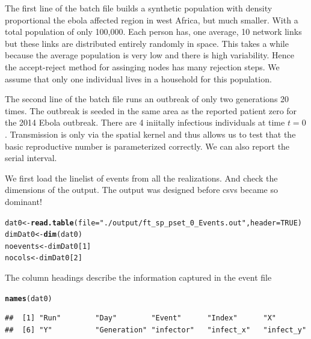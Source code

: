 \documentclass{article}\usepackage{graphicx, color}
\makeatletter
\newcommand{\hlfunctioncall}[1]{\textcolor[rgb]{0.501960784313725,0,0.329411764705882}{\textbf{#1}}}%
\newcommand{\hlstring}[1]{\textcolor[rgb]{0.6,0.6,1}{#1}}%
\newenvironment{kframe}{%
 \def\at@end@of@kframe{}%
 \ifinner\ifhmode%
  \def\at@end@of@kframe{\end{minipage}}%
  \begin{minipage}{\columnwidth}%
 \fi\fi%
 \def\FrameCommand##1{\hskip\@totalleftmargin \hskip-\fboxsep
 \colorbox{shadecolor}{##1}\hskip-\fboxsep
     \hskip-\linewidth \hskip-\@totalleftmargin \hskip\columnwidth}%
 \MakeFramed {\advance\hsize-\width
   \@totalleftmargin\z@ \linewidth\hsize
   \@setminipage}}%
 {\par\unskip\endMakeFramed%
 \at@end@of@kframe}
\newenvironment{knitrout}{}{} %
\makeatother
\begin{document}
The first line of the batch file builds a synthetic population with density
proportional the ebola affected region in west Africa, but much smaller. With a total population of only
100,000. Each person has, one average, 10 network links but these links are
distributed entirely randomly in space. This takes a while because the
average population is very low and there is high variability. Hence the
accept-reject method for assinging nodes has many rejection steps. We assume
that only one individual lives in a household for this population. 


The second line of the batch file runs an outbreak of only two generations 20
times. The outbreak is seeded in the same area as the reported patient zero for
the 2014 Ebola outbreak. There are 4 iniitally infectious individuals at time
$t=0$. Transmission is only via the spatial kernel and thus allows us to test
that the basic reproductive number is parameterized correctly. We can also
report the serial interval.

We first load the linelist of events from all the realizations. And check the
dimensions of the output. The output was designed before csvs became so
dominant!

\begin{knitrout}
\color{fgcolor}\begin{kframe}
\begin{alltt}
dat0 <- \hlfunctioncall{read.table}(file=\hlstring{"./output/ft_sp_pset_0_Events.out"},header=TRUE)
dimDat0 <- \hlfunctioncall{dim}(dat0)
noevents <- dimDat0[1]
nocols <- dimDat0[2]
\end{alltt}
\end{kframe}
\end{knitrout}


The column headings describe the information captured in the event file
\begin{knitrout}
\color{fgcolor}\begin{kframe}
\begin{alltt}
\hlfunctioncall{names}(dat0)
\end{alltt}
\begin{verbatim}
##  [1] "Run"        "Day"        "Event"      "Index"      "X"         
##  [6] "Y"          "Generation" "infector"   "infect_x"   "infect_y"
\end{verbatim}
\end{kframe}
\end{knitrout}
\end{document}
